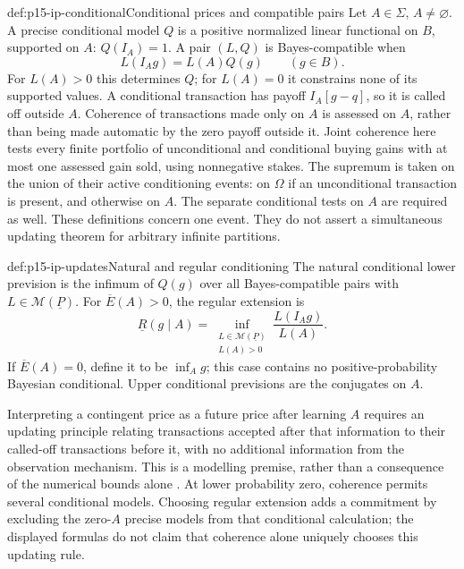 \begin{hbdefinition}{def:p15-ip-conditional}{Conditional prices and compatible pairs}
Let \(A\in\Sigma\), \(A\ne\varnothing\). A precise conditional
model \(Q\) is a positive normalized linear functional on \(B\),
supported on \(A\): \(Q(I_A)=1\). A pair \((L,Q)\) is Bayes-compatible
when
\[
                   L(I_Ag)=L(A)Q(g)\qquad(g\in B).
\]
For \(L(A)>0\) this determines \(Q\); for \(L(A)=0\) it constrains
none of its supported values. A conditional transaction has payoff
\(I_A[g-q]\), so it is called off outside \(A\).
Coherence of transactions made only on \(A\) is assessed on \(A\),
rather than being made automatic by the zero payoff outside it.
Joint coherence here tests every finite portfolio of unconditional and
conditional buying gains with at most one assessed gain sold, using
nonnegative stakes. The supremum is taken on the union of their active
conditioning events: on \(\Omega\) if an unconditional transaction is
present, and otherwise on \(A\). The separate conditional tests on
\(A\) are required as well.
These definitions concern one event. They do not assert a simultaneous
updating theorem for arbitrary infinite partitions.
\end{hbdefinition}

\begin{hbdefinition}{def:p15-ip-updates}{Natural and regular conditioning}
The natural conditional lower prevision is the infimum of \(Q(g)\)
over all Bayes-compatible pairs with \(L\in\mathcal M(\underline P)\).
For \(\overline E(A)>0\), the regular extension is
\[
 \underline R(g\mid A)=
 \inf_{\substack{L\in\mathcal M(\underline P)\\L(A)>0}}
                         \frac{L(I_Ag)}{L(A)}.
\]
If \(\overline E(A)=0\), define it to be \(\inf_A g\); this case
contains no positive-probability Bayesian conditional. Upper conditional
previsions are the conjugates on \(A\).
\end{hbdefinition}

Interpreting a contingent price as a future price after learning \(A\)
requires an updating principle relating transactions accepted after that
information to their called-off transactions before it, with no additional
information from the observation mechanism. This is a modelling premise,
rather than a consequence of the numerical bounds alone
\cite[author manuscript, §3.1]{MirandaCoherentLowerPrevisionsCapture}.
At lower probability zero, coherence permits several conditional models.
Choosing regular extension adds a commitment by excluding the zero-\(A\)
precise models from that conditional calculation; the displayed formulas
do not claim that coherence alone uniquely chooses this updating rule.

